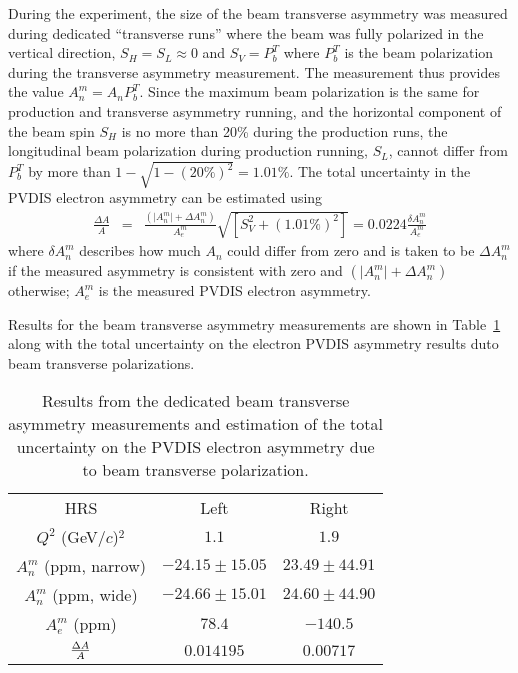 During the experiment, the size of the beam transverse asymmetry was measured during dedicated ``transverse
runs'' where the beam was fully polarized in the vertical direction, $S_H=S_L\approx 0$ and $S_V=P_b^T$ where
$P_b^T$ is the beam polarization during the transverse asymmetry measurement. 
The measurement thus provides the value $A_n^{m}=A_n P_b^{T}$. Since the maximum beam polarization 
is the same for production and transverse asymmetry running, and the horizontal component of the beam
spin $S_H$ is no more than 20\% during the production runs, the longitudinal beam polarization during production
running, $S_L$, cannot differ from $P_b^T$ by more than $1-\sqrt{1-(20\%)^2}=1.01\%$. The total uncertainty
in the PVDIS electron asymmetry can be estimated using
\begin{eqnarray}
 \frac{\Delta A}{A} &=& \frac{(\vert A_n^m\vert +\Delta A_n^m)}{A_e^m}\sqrt{\left[ S_V^2+(1.01\%)^2\right]} 
= 0.0224\frac{\delta A_n^m}{A_e^m}
\end{eqnarray}
where $\delta A_n^m$ describes how much $A_n$ could differ from zero and is taken to be
$\Delta A_n^m$ if the measured asymmetry is consistent with zero and $(\vert A_n^m\vert +\Delta A_n^m)$ otherwise;
$A_e^m$ is the 
measured PVDIS electron asymmetry.

Results for
the beam transverse asymmetry measurements are shown in Table~\ref{tab:ATbg} along with the 
total uncertainty on the electron PVDIS asymmetry results duto beam transverse polarizations.

\begin{table}
 \caption{Results from the dedicated beam transverse asymmetry measurements and estimation
of the total uncertainty on the PVDIS electron asymmetry due to beam transverse polarization.}\label{tab:ATbg}
 \begin{center}
\begin{tabular}{c|c|c}\hline
  HRS                  & Left & Right \\
  $Q^2$ (GeV/$c$)$^2$  & $1.1$ & $1.9$ \\\hline
  $A_n^m$ (ppm, narrow)& $-24.15\pm 15.05$ & $23.49\pm 44.91$ \\
  $A_n^m$ (ppm, wide)  & $-24.66\pm 15.01$    & $24.60\pm 44.90$\\
  $A_e^m$ (ppm)       & $78.4$ & $-140.5$ \\
  ${\Delta A}\over{A}$ & $0.014195$ & $0.00717$\\\hline
\end{tabular}
 \end{center}
\end{table}


